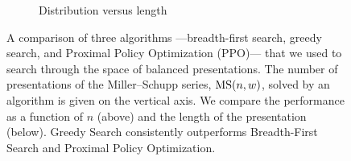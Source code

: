 \begin{figure}
\begin{subfigure}[b]{0.45\textwidth}
		\caption{Distribution versus length}
		\label{fig:performance_vs_length}
	\end{subfigure}
	\caption{A comparison of three algorithms ---breadth-first search, greedy search, and Proximal Policy Optimization (PPO)--- that we used to search through the space of balanced presentations. The number of presentations of the Miller--Schupp series, $\text{MS}(n, w)$, solved by an algorithm is given on the vertical axis. We compare the performance as a function of $n$ (above) and the length of the presentation (below). Greedy Search consistently outperforms Breadth-First Search and Proximal Policy Optimization.}
	\label{fig:performance}
\end{figure}